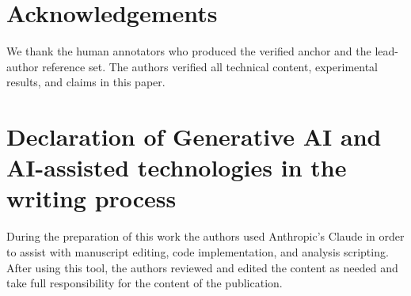 \documentclass[preprint,12pt]{elsarticle}
\begin{document}
\section*{Acknowledgements}
We thank the human annotators who produced the verified anchor and the lead-author reference
set. The authors verified all technical content, experimental results, and claims in this paper.


\section*{Declaration of Generative AI and AI-assisted technologies in the writing process}
During the preparation of this work the authors used Anthropic's Claude in order to assist with
manuscript editing, code implementation, and analysis scripting. After using this tool, the
authors reviewed and edited the content as needed and take full responsibility for the content of
the publication.
\end{document}
